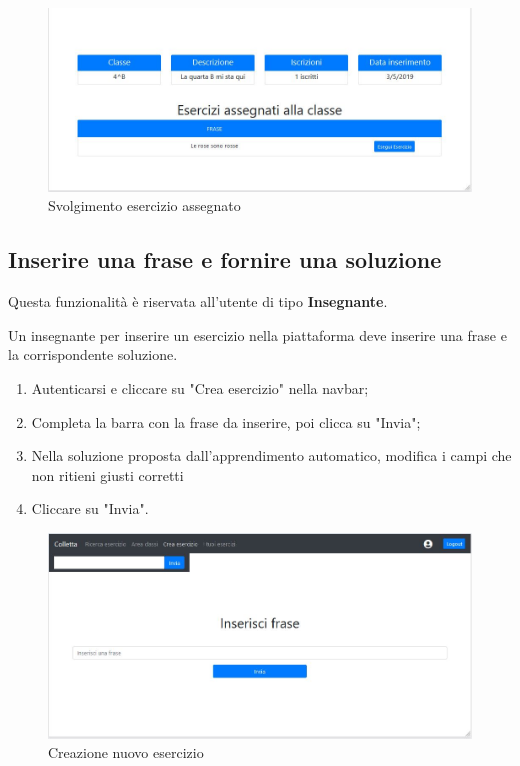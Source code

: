 \documentclass[11pt,a4paper]{article}
\begin{document}
{	\begin{figure}[h]
		\centering
		\includegraphics[scale=0.65]{images/esassegnato.jpg}
		\caption{Svolgimento esercizio assegnato}
	\end{figure}
		
	\newpage
	\subsection{Inserire una frase e fornire una soluzione}
		Questa funzionalità è riservata all'utente di tipo \textbf{Insegnante}.
		
		Un insegnante per inserire un esercizio nella piattaforma deve inserire una frase e la corrispondente soluzione.
		
		\begin{enumerate}
			\item Autenticarsi e cliccare su "Crea esercizio" nella navbar;
			\item Completa la barra con la frase da inserire, poi clicca su "Invia";
			\item Nella soluzione proposta dall'apprendimento automatico, modifica i campi che non ritieni giusti corretti
			\item Cliccare su "Invia". 
		\end{enumerate}
	
		\begin{figure}[h]
			\centering
			\includegraphics[scale=0.65]{images/creaes.jpg}
			\caption{Creazione nuovo esercizio}
		\end{figure}

}
\end{document}

